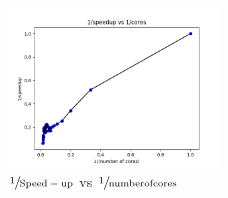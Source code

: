 \documentclass[12pt]{article}
\theoremstyle{plain}
\theoremstyle{definition}
\begin{document}
\begin{figure}
        \includegraphics[width=0.5\textwidth]{inverseq2_strong.png}
        \caption{$\sfrac{1}{\mathrm{Speed-up}}$ vs $\sfrac{1}{\mathrm{number of cores}}$}
        \label{fig:inverse1a}
\end{figure}


\end{document}

